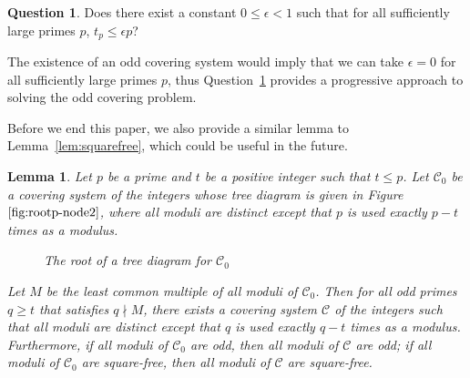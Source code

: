 \documentclass[12pt]{article}
\newtheorem{lemma}[theorem]{Lemma}
\theoremstyle{definition}
\newtheorem{question}[theorem]{Question}
\renewcommand{\i}{\textup{\textbf{i}}}
\renewcommand{\j}{\textup{\textbf{j}}}
\newcommand{\p}{\textup{\textbf{p}}}
\begin{document}
\begin{question}\label{question:final}
Does there exist a constant $0\leq\epsilon<1$ such that for all sufficiently large primes $p$, $t_p\leq\epsilon p$?
\end{question}

The existence of an odd covering system would imply that we can take $\epsilon=0$ for all sufficiently large primes $p$, thus Question~\ref{question:final} provides a progressive approach to solving the odd covering problem.




Before we end this paper, we also provide a similar lemma to Lemma~\ref{lem:squarefree}, which could be useful in the future.

\begin{lemma}\label{lem:nonsquarefree}
Let $p$ be a prime and $t$ be a positive integer such that $t\leq p$. Let $\mathcal{C}_0$ be a covering system of the integers whose tree diagram is given in Figure~$\ref{fig:rootp-node2}$, where all moduli are distinct except that $p$ is used exactly $p-t$ times as a modulus.
\begin{figure}[H]
\centering
{}
\caption{The root of a tree diagram for $\mathcal{C}_0$}
\label{fig:rootp-node2}
\end{figure}
\noindent Let $M$ be the least common multiple of all moduli of $\mathcal{C}_0$. Then for all odd primes $q\geq t$ that satisfies $q\nmid M$, there exists a covering system $\mathcal{C}$ of the integers such that all moduli are distinct except that $q$ is used exactly $q-t$ times as a modulus. Furthermore, if all moduli of $\mathcal{C}_0$ are odd, then all moduli of $\mathcal{C}$ are odd; if all moduli of $\mathcal{C}_0$ are square-free, then all moduli of $\mathcal{C}$ are square-free.
\end{lemma}
\end{document}
